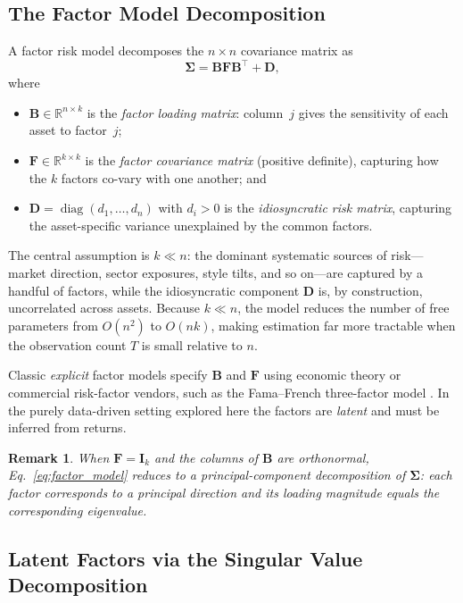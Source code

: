 \documentclass[11pt,a4paper]{article}
\newcommand{\I}{\mathbf{I}}
\newcommand{\R}{\mathbb{R}}
\newcommand{\Bload}{\mathbf{B}}
\newcommand{\Ffac}{\mathbf{F}}
\newcommand{\Dspe}{\mathbf{D}}
\newtheorem{remark}{Remark}
\begin{document}
\subsection{The Factor Model Decomposition}
\label{sec:factor_model_decomp}

A factor risk model decomposes the $n \times n$ covariance matrix as
\begin{equation}
  \label{eq:factor_model}
  \bm{\Sigma} = \Bload\Ffac\Bload^\top + \Dspe,
\end{equation}
where
\begin{itemize}
  \item $\Bload \in \R^{n \times k}$ is the \emph{factor loading matrix}: column~$j$
    gives the sensitivity of each asset to factor~$j$;
  \item $\Ffac \in \R^{k \times k}$ is the \emph{factor covariance matrix}
    (positive definite), capturing how the $k$ factors co-vary with one
    another; and
  \item $\Dspe = \operatorname{diag}(d_1, \dots, d_n)$ with $d_i > 0$ is the
    \emph{idiosyncratic risk matrix}, capturing the asset-specific variance
    unexplained by the common factors.
\end{itemize}

The central assumption is $k \ll n$: the dominant systematic
sources of risk---market direction, sector exposures, style tilts, and so
on---are captured by a handful of factors, while the idiosyncratic component
$\Dspe$ is, by construction, uncorrelated across assets.  Because $k \ll n$,
the model reduces the number of free parameters from $O(n^2)$ to $O(nk)$,
making estimation far more tractable when the observation count $T$ is small
relative to $n$.

Classic \emph{explicit} factor models specify $\Bload$ and $\Ffac$ using
economic theory or commercial risk-factor vendors, such as the Fama--French
three-factor model \citep{fama1993}.  In the purely data-driven setting
explored here the factors are \emph{latent} and must be inferred from returns.

\begin{remark}
  When $\Ffac = \I_k$ and the columns of $\Bload$ are orthonormal,
  Eq.~\eqref{eq:factor_model} reduces to a principal-component
  decomposition of $\bm{\Sigma}$: each factor corresponds to a principal
  direction and its loading magnitude equals the corresponding eigenvalue.
\end{remark}

\subsection{Latent Factors via the Singular Value Decomposition}
\label{sec:svd_factors}
\end{document}

